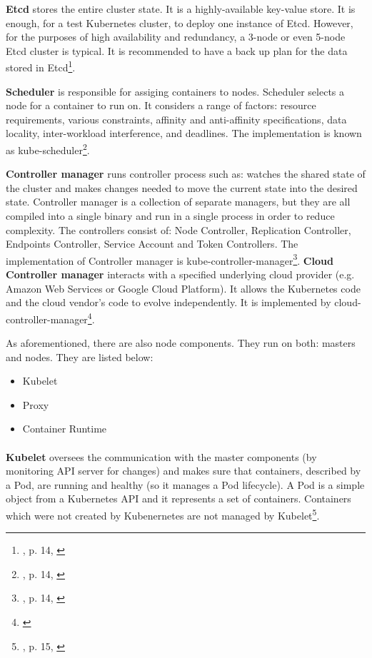 \textbf{Etcd} stores the entire cluster state. It is a highly-available key-value store. It is enough, for a test Kubernetes cluster, to deploy one instance of Etcd. However, for the purposes of high availability and redundancy, a 3-node or even 5-node Etcd cluster is typical. It is recommended to have a back up plan for the data stored in Etcd\footnote{\cite{book-mastering-k8s}, p. 14, \cite{k8s-components}}.

\textbf{Scheduler} is responsible for assiging containers to nodes. Scheduler selects a node for a container to run on. It considers a range of factors: resource requirements, various constraints, affinity and anti-affinity specifications, data locality, inter-workload interference, and deadlines. The implementation is known as kube-scheduler\footnote{\cite{book-mastering-k8s}, p. 14, \cite{k8s-components}}.

\textbf{Controller manager} runs controller process such as: watches the shared state of the cluster and makes changes needed to move the current state into the desired state. Controller manager is a collection of separate managers, but they are all compiled into a single binary and run in a single process in order to reduce complexity. The controllers consist of: Node Controller, Replication Controller, Endpoints Controller, Service Account and Token Controllers. The implementation of Controller manager is kube-controller-manager\footnote{\cite{book-mastering-k8s}, p. 14, \cite{k8s-components}}. \textbf{Cloud Controller manager} interacts with a specified underlying cloud provider (e.g. Amazon Web Services or Google Cloud Platform). It allows the Kubernetes code and the cloud vendor’s code to evolve independently. It is implemented by cloud-controller-manager\footnote{\cite{k8s-components}}.

As aforementioned, there are also node components. They run on both: masters and nodes. They are listed below:
\begin{itemize}
\item Kubelet
\item Proxy
\item Container Runtime
\end{itemize}

\paragraph{}
\textbf{Kubelet} oversees the communication with the master components (by monitoring API server for changes) and makes sure that containers, described by a Pod, are running and healthy (so it manages a Pod lifecycle). A Pod is a simple object from a Kubernetes API and it represents a set of containers. Containers which were not created by Kubenernetes are not managed by Kubelet\footnote{\cite{book-mastering-k8s}, p. 15, \cite{k8s-components}}.

